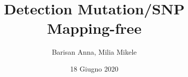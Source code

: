 \documentclass{article}
\begin{document}
\title{Detection Mutation/SNP Mapping-free}
\author{Barisan Anna, Milia Mikele}
\date{18 Giugno 2020}

\maketitle

%
%
%



\end{document}
